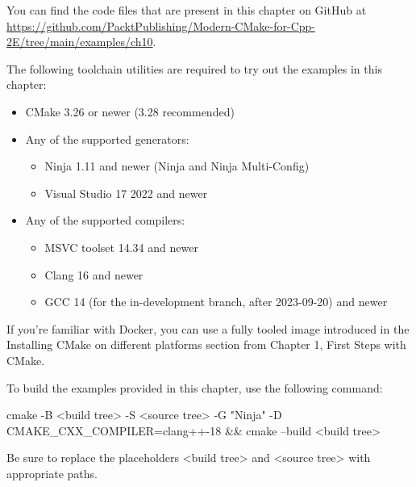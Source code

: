 You can find the code files that are present in this chapter on GitHub at \url{https://github.com/PacktPublishing/Modern-CMake-for-Cpp-2E/tree/main/examples/ch10}.

The following toolchain utilities are required to try out the examples in this chapter:


\begin{itemize}
\item
CMake 3.26 or newer (3.28 recommended)

\item
Any of the supported generators:
\begin{itemize}
\item
Ninja 1.11 and newer (Ninja and Ninja Multi-Config)

\item
Visual Studio 17 2022 and newer
\end{itemize}

\item
Any of the supported compilers:
\begin{itemize}
\item
MSVC toolset 14.34 and newer

\item
Clang 16 and newer

\item
GCC 14 (for the in-development branch, after 2023-09-20) and newer
\end{itemize}
\end{itemize}

If you’re familiar with Docker, you can use a fully tooled image introduced in the Installing CMake on different platforms section from Chapter 1, First Steps with CMake.

To build the examples provided in this chapter, use the following command:

\begin{shell}
cmake -B <build tree> -S <source tree> -G "Ninja" -D CMAKE_CXX_COMPILER=clang++-18 && cmake --build <build tree>
\end{shell}

Be sure to replace the placeholders <build tree> and <source tree> with appropriate paths.












